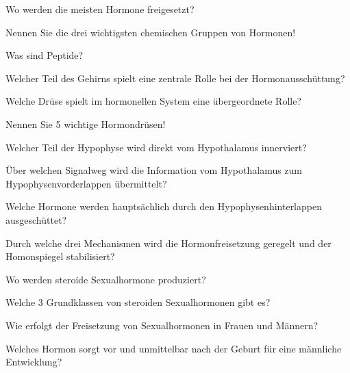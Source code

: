 \documentclass[10pt, a4paper]{exam}
\begin{document}
\begin{questions}
\begin{solution}
  \end{solution}
  \question Wo werden die meisten Hormone freigesetzt?
  \begin{solution}
  \end{solution}
  \question Nennen Sie die drei wichtigsten chemischen Gruppen von Hormonen!
  \begin{solution}
  \end{solution}
  \question Was sind Peptide?
  \begin{solution}
  \end{solution}
  \question Welcher Teil des Gehirns spielt eine zentrale Rolle bei der Hormonausschüttung?
  \begin{solution}
  \end{solution}
  \question Welche Drüse spielt im hormonellen System eine übergeordnete Rolle?
  \begin{solution}
  \end{solution}
  \question Nennen Sie 5 wichtige Hormondrüsen!
  \begin{solution}
  \end{solution}
  \question Welcher Teil der Hypophyse wird direkt vom Hypothalamus innerviert?
  \begin{solution}
  \end{solution}
  \question Über welchen Signalweg wird die Information vom Hypothalamus zum Hypophysenvorderlappen übermittelt?
  \begin{solution}
  \end{solution}
  \question Welche Hormone werden hauptsächlich durch den Hypophysenhinterlappen ausgeschüttet?
  \begin{solution}
  \end{solution}
  \question Durch welche drei Mechanismen wird die Hormonfreisetzung geregelt und der Homonspiegel stabilisiert?
  \begin{solution}
  \end{solution}
  \question Wo werden steroide Sexualhormone produziert?
  \begin{solution}
  \end{solution}
  \question Welche 3 Grundklassen von steroiden Sexualhormonen gibt es?
  \begin{solution}
  \end{solution}
  \question Wie erfolgt der Freisetzung von Sexualhormonen in Frauen und Männern?
  \begin{solution}
  \end{solution}
  \question Welches Hormon sorgt vor und unmittelbar nach der Geburt für eine männliche Entwicklung?

\end{questions}
\end{document}
